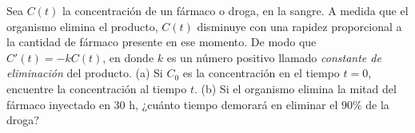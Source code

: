 \item Sea $C(t)$ la concentración de un fármaco o droga, en la sangre. A medida que el organismo elimina el producto, $C(t)$ disminuye con una rapidez proporcional a la cantidad de fármaco presente en ese momento. De modo que $C'(t) = -kC(t)$, en donde $k$ es un número positivo llamado \textit{constante de eliminación} del producto. (a) Si $C_0$ es la concentración en el tiempo $t = 0$, encuentre la concentración al tiempo $t$. (b) Si el organismo elimina la mitad del fármaco inyectado en $30 \text{ h}$, ¿cuánto tiempo demorará en eliminar el $90\%$ de la droga?
